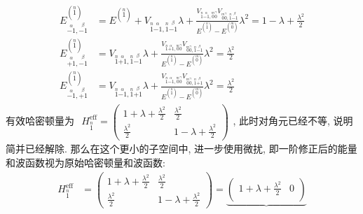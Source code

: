 \documentclass[../../main.tex]{subfiles}
\begin{document}
\begin{enumerate}
\begin{enumerate}
{{\begin{align*}
        E^{(\stackrel{n}{1})}_{\stackrel{\alpha}{-1},\stackrel{\beta}{-1}} &= 
        E^{(\stackrel{n}{1})}
        + V_{\stackrel{n}{1}\stackrel{\alpha}{-1},\stackrel{n}{1}\stackrel{\beta}{-1}}\lambda
        + \frac{V_{\stackrel{n}{1}\stackrel{\alpha}{-1},\stackrel{m}{0}\stackrel{\gamma}{0}}V_{\stackrel{m}{0}\stackrel{\gamma}{0},\stackrel{n}{1}\stackrel{\beta}{-1}}}{E^{(\stackrel{n}{1})} - E^{(\stackrel{m}{0})}}\lambda^{2} = 1 - \lambda + \frac{\lambda^{2}}{2}\\
        E^{(\stackrel{n}{1})}_{\stackrel{\alpha}{+1},\stackrel{\beta}{-1}} &=
        V_{\stackrel{n}{1}\stackrel{\alpha}{+1},\stackrel{n}{1}\stackrel{\beta}{-1}}\lambda + \frac{V_{\stackrel{n}{1}\stackrel{\alpha}{+1},\stackrel{m}{0}\stackrel{\gamma}{0}}V_{\stackrel{m}{0}\stackrel{\gamma}{0},\stackrel{n}{1}\stackrel{\beta}{-1}}}{E^{(\stackrel{n}{1})} - E^{(\stackrel{m}{0})}}\lambda^{2} =  \frac{\lambda^{2}}{2}\\
        E^{(\stackrel{n}{1})}_{\stackrel{\alpha}{-1},\stackrel{\beta}{+1}} &=
        V_{\stackrel{n}{1}\stackrel{\alpha}{-1},\stackrel{n}{1}\stackrel{\beta}{+1}}\lambda + \frac{V_{\stackrel{n}{1}\stackrel{\alpha}{-1},\stackrel{m}{0}\stackrel{\gamma}{0}}V_{\stackrel{m}{0}\stackrel{\gamma}{0},\stackrel{n}{1}\stackrel{\beta}{+1}}}{E^{(\stackrel{n}{1})} - E^{(\stackrel{m}{0})}}\lambda^{2} =  \frac{\lambda^{2}}{2}
    \end{align*}
    有效哈密顿量为 $\begin{aligned}
        H_{\stackrel{n}{1}}^{\text{eff}} = \begin{pmatrix}
            1 + \lambda + \frac{\lambda^{2}}{2} & \frac{\lambda^{2}}{2}\\
            \frac{\lambda^{2}}{2} & 1 - \lambda + \frac{\lambda^{2}}{2}
        \end{pmatrix}
    \end{aligned}$, 此时对角元已经不等, 说明简并已经解除. 那么在这个更小的子空间中, 进一步使用微扰, 即一阶修正后的能量和波函数视为原始哈密顿量和波函数:
    \begin{align*}
        H_{\stackrel{n}{1}}^{\text{eff}} &= \begin{pmatrix}
            1 + \lambda + \frac{\lambda^{2}}{2} & \frac{\lambda^{2}}{2}\\
            \frac{\lambda^{2}}{2} & 1 - \lambda + \frac{\lambda^{2}}{2}
        \end{pmatrix} = \underbrace{\begin{pmatrix}
            1 + \lambda + \frac{\lambda^{2}}{2}  & 0\\

\end{pmatrix}}
\end{align*}}}
\end{enumerate}
\end{enumerate}
\end{document}
